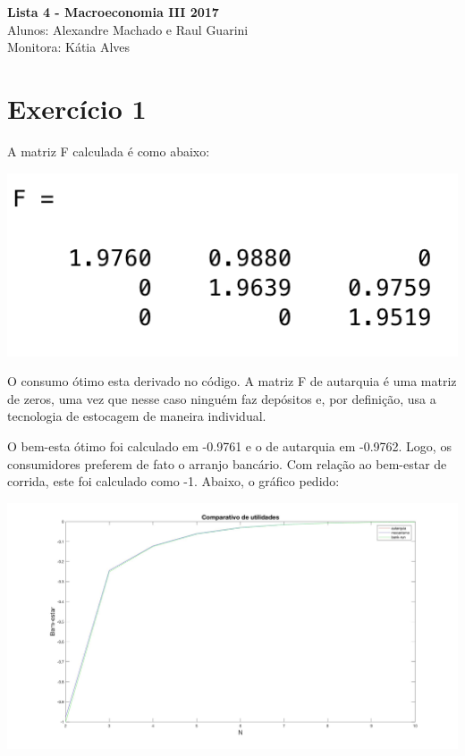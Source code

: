 \documentclass[10pt]{article}
\begin{document}
	\begin{center}
		{\Large{\textbf{Lista 4 - Macroeconomia III 2017}}}\\
		\vspace{0.2cm}
		Alunos: Alexandre Machado e Raul Guarini\\
		Monitora: Kátia Alves
	\end{center}
	
\section*{Exercício 1}
A matriz F calculada é como abaixo:
\begin{center}
	\includegraphics[scale = 0.7]{F}
\end{center}

O consumo ótimo esta derivado no código. A matriz F de autarquia é uma matriz de zeros, uma vez que nesse caso ninguém faz depósitos e, por definição, usa a tecnologia de estocagem de maneira individual.

O bem-esta ótimo foi calculado em -0.9761 e o de autarquia em -0.9762. Logo, os consumidores preferem de fato o arranjo bancário. Com relação ao bem-estar de corrida, este foi calculado como -1. Abaixo, o gráfico pedido:

\begin{center}
	\includegraphics[scale = 0.2]{comparativo}
\end{center}
\end{document}
